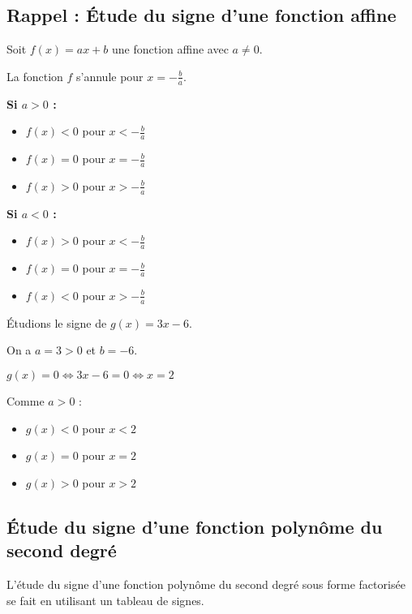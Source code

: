 \documentclass[11pt,a4paper]{article}
\begin{document}
	\subsection{Rappel : Étude du signe d'une fonction affine}
	
	\begin{propriete}
		Soit $f(x) = ax + b$ une fonction affine avec $a \neq 0$.
		
		La fonction $f$ s'annule pour $x = -\frac{b}{a}$.
		
		\textbf{Si $a > 0$ :}
		\begin{itemize}
			\item $f(x) < 0$ pour $x < -\frac{b}{a}$
			\item $f(x) = 0$ pour $x = -\frac{b}{a}$
			\item $f(x) > 0$ pour $x > -\frac{b}{a}$
		\end{itemize}
		
		\textbf{Si $a < 0$ :}
		\begin{itemize}
			\item $f(x) > 0$ pour $x < -\frac{b}{a}$
			\item $f(x) = 0$ pour $x = -\frac{b}{a}$
			\item $f(x) < 0$ pour $x > -\frac{b}{a}$
		\end{itemize}
	\end{propriete}
	
	\begin{exemple}
		Étudions le signe de $g(x) = 3x - 6$.
		
		On a $a = 3 > 0$ et $b = -6$.
		
		$g(x) = 0 \Leftrightarrow 3x - 6 = 0 \Leftrightarrow x = 2$
		
		Comme $a > 0$ :
		\begin{itemize}
			\item $g(x) < 0$ pour $x < 2$
			\item $g(x) = 0$ pour $x = 2$
			\item $g(x) > 0$ pour $x > 2$
		\end{itemize}
	\end{exemple}
	
	\subsection{Étude du signe d'une fonction polynôme du second degré}
	
	L'étude du signe d'une fonction polynôme du second degré sous forme factorisée se fait en utilisant un tableau de signes.
	
\end{document}
